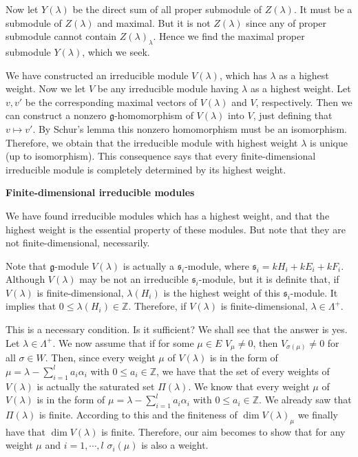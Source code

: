 \documentclass{article}
\newcommand{\InZ}{\mathbb{Z}}
\newcommand{\lie}[1]{\mathfrak{#1}}
\begin{document}
Now let $Y(\lambda)$ be the direct sum of all proper submodule of $Z(\lambda)$.
It must be a submodule of $Z(\lambda)$ and maximal.
But it is not $Z(\lambda)$ since any of proper submodule cannot contain $Z(\lambda)_\lambda$.
Hence we find the maximal proper submodule $Y(\lambda)$, which we seek.

We have constructed an irreducible module $V(\lambda)$, which has $\lambda$ as a highest weight.
Now we let $V$ be any irreducible module having $\lambda$ as a highest weight.
Let $v, v'$ be the corresponding maximal vectors of $V(\lambda)$ and $V$, respectively.
Then we can construct a nonzero $\lie{g}$-homomorphism of $V(\lambda)$ into $V$, just defining that $v \mapsto v'$.
By Schur's lemma this nonzero homomorphism must be an isomorphism.
Therefore, we obtain that the irreducible module with highest weight $\lambda$ is unique (up to isomorphism).
This consequence says that every finite-dimensional irreducible module is completely determined by its highest weight.

\newpage

\textbf{Finite-dimensional irreducible modules}

We have found irreducible modules which has a highest weight, and that the highest weight is the essential property of these modules.
But note that they are not finite-dimensional, necessarily.

Note that $\lie{g}$-module $V(\lambda)$ is actually a $\lie{s}_i$-module, where $\lie{s}_i = kH_i + kE_i + kF_i$.
Although $V(\lambda)$ may be not an irreducible $\lie{s}_i$-module, but it is definite that, if $V(\lambda)$ is finite-dimensional, $\lambda(H_i)$ is the highest weight of this $\lie{s}_i$-module.
It implies that $0 \le \lambda(H_i) \in \InZ$.
Therefore, if $V(\lambda)$ is finite-dimensional, $\lambda \in \Lambda^+$.

This is a necessary condition.
Is it sufficient?
We shall see that the answer is yes.
Let $\lambda \in \Lambda^+$.
We now assume that if for some $\mu \in E$ $V_\mu \ne 0$, then $V_{\sigma(\mu)} \ne 0$ for all $\sigma \in W$.
Then, since every weight $\mu$ of $V(\lambda)$ is in the form of $\mu = \lambda - \sum_{i = 1}^l a_i \alpha_i$ with $0 \le a_i \in \InZ$, we have that the set of every weights of $V(\lambda)$ is actually the saturated set $\Pi(\lambda)$.
We know that every weight $\mu$ of $V(\lambda)$ is in the form of $\mu = \lambda - \sum_{i = 1}^l a_i \alpha_i$ with $0 \le a_i \in \InZ$.
We already saw that $\Pi(\lambda)$ is finite.
According to this and the finiteness of $\dim{V(\lambda)_\mu}$ we finally have that $\dim{V(\lambda)}$ is finite.
Therefore, our aim becomes to show that for any weight $\mu$ and $i= 1, \cdots, l$ $\sigma_i(\mu)$ is also a weight.
\end{document}
